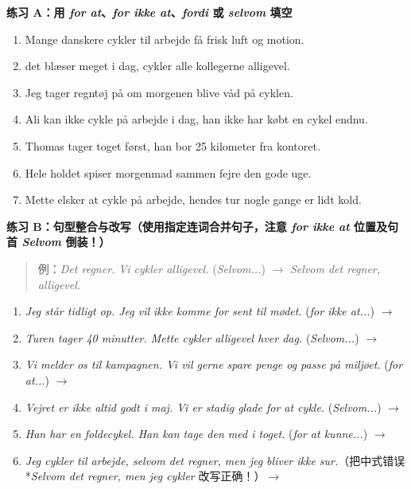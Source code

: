 
\textbf{练习 A：用 \textit{for at}、\textit{for ikke at}、\textit{fordi} 或 \textit{selvom} 填空}
\begin{enumerate}
  \item Mange danskere cykler til arbejde \underline{\hspace{2.2cm}} få frisk luft og motion.
  \item \underline{\hspace{2.2cm}} det blæser meget i dag, cykler alle kollegerne alligevel.
  \item Jeg tager regntøj på om morgenen \underline{\hspace{2.2cm}} blive våd på cyklen.
  \item Ali kan ikke cykle på arbejde i dag, \underline{\hspace{2.2cm}} han ikke har købt en cykel endnu.
  \item Thomas tager toget først, \underline{\hspace{2.2cm}} han bor 25 kilometer fra kontoret.
  \item Hele holdet spiser morgenmad sammen \underline{\hspace{2.2cm}} fejre den gode uge.
  \item Mette elsker at cykle på arbejde, \underline{\hspace{2.2cm}} hendes tur nogle gange er lidt kold.
\end{enumerate}

\textbf{练习 B：句型整合与改写（使用指定连词合并句子，注意 \textit{for ikke at} 位置及句首 \textit{Selvom} 倒装！）}
\begin{quote}
\small 例：\textit{Det regner. Vi cykler alligevel.} (\textit{Selvom...}) $\rightarrow$ \textit{Selvom det regner,  alligevel.}
\end{quote}
\begin{enumerate}
  \item \textit{Jeg står tidligt op. Jeg vil ikke komme for sent til mødet.} (\textit{for ikke at...}) $\rightarrow$
  \item \textit{Turen tager 40 minutter. Mette cykler alligevel hver dag.} (\textit{Selvom...}) $\rightarrow$
  \item \textit{Vi melder os til kampagnen. Vi vil gerne spare penge og passe på miljøet.} (\textit{for at...}) $\rightarrow$
  \item \textit{Vejret er ikke altid godt i maj. Vi er stadig glade for at cykle.} (\textit{Selvom...}) $\rightarrow$
  \item \textit{Han har en foldecykel. Han kan tage den med i toget.} (\textit{for at kunne...}) $\rightarrow$
  \item \textit{Jeg cykler til arbejde, selvom det regner, men jeg bliver ikke sur.}（把中式错误 *\textit{Selvom det regner, men jeg cykler} 改写正确！）$\rightarrow$
\end{enumerate}

